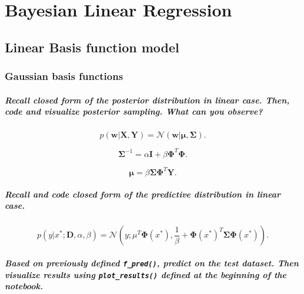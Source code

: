 \graphicspath{{figs/3a}}
\chapter{Bayesian Linear Regression}




\section{Linear Basis function model}
\subsection{Gaussian basis functions}
\paragraph*{Recall closed form of the posterior distribution in linear case. Then, code and visualize posterior sampling. What can you observe?}
\[
    p(\mathbf{w}|\mathbf{X}, \mathbf{Y}) = \mathcal{N}(\mathbf{w}|\boldsymbol{\mu}, \boldsymbol{\Sigma})
.\]

\[
    \boldsymbol{\Sigma}^{-1} = \alpha \mathbf{I} + \beta \boldsymbol{\Phi}^T \boldsymbol{\Phi}
.\]

\[
    \boldsymbol{\mu} = \beta \boldsymbol{\Sigma} \boldsymbol{\Phi}^T \mathbf{Y}
.\]

\paragraph*{Recall and code closed form of the predictive distribution in linear case.}
\[
    p\left(y|x^*; \mathbf{D}, \alpha, \beta\right) = \mathcal{N}\left(y; \mu^T \boldsymbol{\Phi}(x^*), \frac{1}{\beta} + \boldsymbol{\Phi}(x^*)^T \boldsymbol{\Sigma} \boldsymbol{\Phi}(x^*)\right)
.\]

\paragraph*{Based on previously defined \texttt{f\_pred()}, predict on the test dataset. Then visualize results using \texttt{plot\_results()} defined at the beginning of the notebook.}
\begin{figure}[H]
    \centering
\end{figure}

